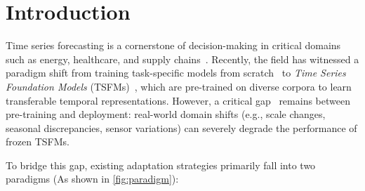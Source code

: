 \section{Introduction}

Time series forecasting is a cornerstone of decision-making in critical domains such as energy, healthcare, and supply chains~\cite{rezaei2021stock,tzelepi2023deep,sun2022accurate,idrees2019prediction,kiyasseh2021clocs,liu2025towards,lei2026hierarchical}. Recently, the field has witnessed a paradigm shift from training task-specific models from scratch~\cite{zhou2021informer,wu2021autoformer,zhou2022fedformer,wu2023timesnet,liu2023itransformer,lyu2025occamvts} to \textit{Time Series Foundation Models} (TSFMs)~\cite{das2024decoder,goswami2024moment,liu2024timer,liu2025sundial,xiao2025timefound,graf2025flowstate}, which are pre-trained on diverse corpora to learn transferable temporal representations. However, a critical gap~\cite{hinder2024one,wen2023onenet,zhao2025proactive,jin2022domain,he2023domain,zhonglearning,zhong2026learning} remains between pre-training and deployment: real-world domain shifts (e.g., scale changes, seasonal discrepancies, sensor variations) can severely degrade the performance of frozen TSFMs.

To bridge this gap, existing adaptation strategies primarily fall into two paradigms (As shown in \autoref{fig:paradigm}):





